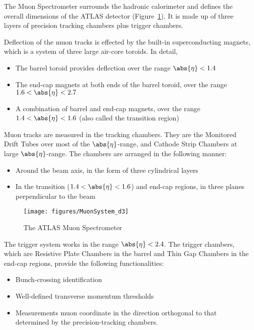 The Muon Spectrometer surrounds the hadronic calorimeter and defines the
overall dimensions of the ATLAS detector (Figure~\ref{f:muons}). It is made up
of three layers of precision tracking chambers plus trigger chambers.

Deflection of the muon tracks is effected by the built-in superconducting
magnets, which is a system of three large air-core toroids. In detail,

\begin{itemize}
	\item The barrel toroid provides deflection over the range $\abs{\eta} < 1.4$

	\item The end-cap magnets at both ends of the barrel toroid, over the range
	      $1.6 < \abs{\eta} < 2.7$

	\item A combination of barrel and end-cap magnets, over the range $1.4 <
		      \abs{\eta} < 1.6$ (also called the transition region)

\end{itemize}

Muon tracks are measured in the tracking chambers. They are the Monitored Drift
Tubes over most of the $\abs{\eta}$-range, and Cathode Strip Chambers at large
$\abs{\eta}$-range. The chambers are arranged in the following manner:

\begin{itemize}
	\item Around the beam axis, in the form of three cylindrical layers

	\item In the transition ($1.4 < \abs{\eta} < 1.6$) and end-cap regions, in
	      three planes perpendicular to the beam

\end{itemize}

\begin{figure}[H]
	\texttt{[image: figures/MuonSystem\_d3]}
	\centering
	\caption{The ATLAS Muon Spectrometer}
	\label{f:muons}
\end{figure}

The trigger system works in the range $\abs{\eta} < 2.4$. The trigger chambers,
which are Resistive Plate Chambers in the barrel and Thin Gap Chambers in the
end-cap regions, provide the following functionalities:

\begin{itemize}
	\item Bunch-crossing identification

	\item Well-defined transverse momentum thresholds

	\item Measurements muon coordinate in the direction orthogonal to that
	      determined by the precision-tracking chambers.

\end{itemize}

